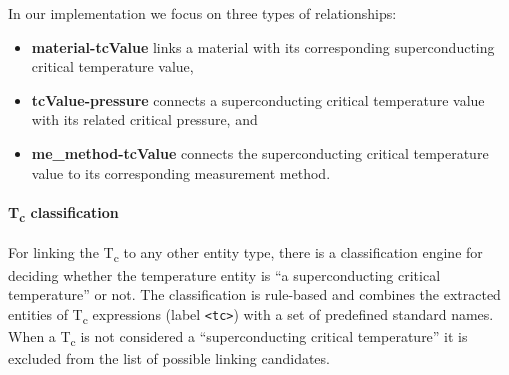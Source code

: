 \documentclass{article}
\begin{document}
In our implementation we focus on three types of relationships: 
\begin{itemize}
    \item \textbf{material-tcValue} links a material with its corresponding superconducting critical temperature value, 
    \item \textbf{tcValue-pressure} connects a superconducting critical temperature value with its related critical pressure, and 
    \item \textbf{me\_method-tcValue} connects the superconducting critical temperature value to its corresponding measurement method.
\end{itemize}

\paragraph{T\textsubscript{c} classification}
For linking the T\textsubscript{c} to any other entity type, there is a classification engine for deciding whether the temperature entity is  ``a superconducting critical temperature'' or not. 
The classification is rule-based and combines the extracted entities of T\textsubscript{c} expressions (label \texttt{<tc>}) with a set of predefined standard names. 
When a T\textsubscript{c} is not considered a ``superconducting critical temperature'' it is excluded from the list of possible linking candidates. 
\end{document}
